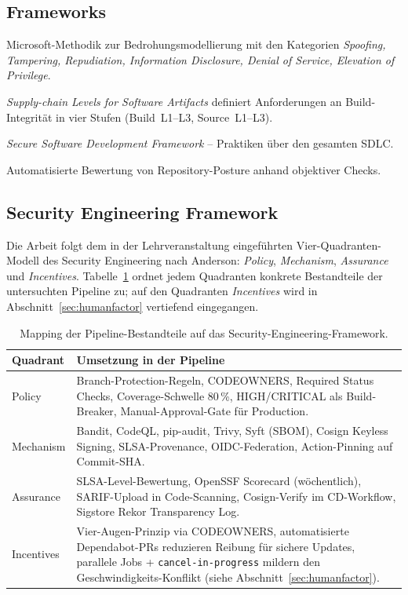 \documentclass[12pt, a4paper]{scrartcl}
\begin{document}
\subsection{Frameworks}
\begin{description}[leftmargin=1.4em,style=nextline]
  \item[STRIDE] Microsoft-Methodik zur Bedrohungsmodellierung mit den
        Kategorien \emph{Spoofing, Tampering, Repudiation, Information
        Disclosure, Denial of Service, Elevation of Privilege}.
  \item[SLSA v1.0] \emph{Supply-chain Levels for Software Artifacts}
        definiert Anforderungen an Build-Integrität in vier Stufen
        (Build~L1--L3, Source~L1--L3).
  \item[NIST SSDF (SP\,800-218)] \emph{Secure Software Development Framework}
        -- Praktiken über den gesamten SDLC.
  \item[OpenSSF Scorecard] Automatisierte Bewertung von Repository-Posture
        anhand objektiver Checks.
\end{description}

\subsection{Security Engineering Framework}\label{sec:seframework}
Die Arbeit folgt dem in der Lehrveranstaltung eingeführten
Vier-Quadranten-Modell des Security Engineering nach Anderson:
\emph{Policy}, \emph{Mechanism}, \emph{Assurance} und \emph{Incentives}.
Tabelle~\ref{tab:seframework} ordnet jedem Quadranten konkrete
Bestandteile der untersuchten Pipeline zu; auf den Quadranten
\emph{Incentives} wird in Abschnitt~\ref{sec:humanfactor} vertiefend
eingegangen.

\begin{table}[h]
\centering
\begin{tabular}{p{2.4cm} p{11.5cm}}
\toprule
\textbf{Quadrant} & \textbf{Umsetzung in der Pipeline} \\
\midrule
Policy &
Branch-Protection-Regeln, CODEOWNERS, Required Status Checks,
Coverage-Schwelle 80\,\%, HIGH/CRITICAL als Build-Breaker,
Manual-Approval-Gate für Production. \\
Mechanism &
Bandit, CodeQL, pip-audit, Trivy, Syft (SBOM), Cosign Keyless Signing,
SLSA-Provenance, OIDC-Federation, Action-Pinning auf Commit-SHA. \\
Assurance &
SLSA-Level-Bewertung, OpenSSF Scorecard (wöchentlich),
SARIF-Upload in Code-Scanning, Cosign-Verify im CD-Workflow,
Sigstore Rekor Transparency Log. \\
Incentives &
Vier-Augen-Prinzip via CODEOWNERS, automatisierte Dependabot-PRs
reduzieren Reibung für sichere Updates, parallele Jobs +
\texttt{cancel-in-progress} mildern den Geschwindigkeits-Konflikt
(siehe Abschnitt~\ref{sec:humanfactor}). \\
\bottomrule
\end{tabular}
\caption{Mapping der Pipeline-Bestandteile auf das
Security-Engineering-Framework.}
\label{tab:seframework}
\end{table}
\end{document}
